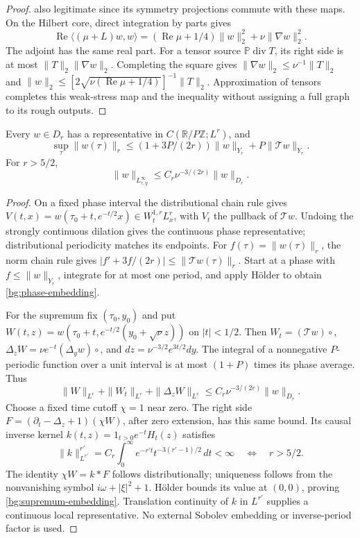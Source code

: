 \begin{proof}
also legitimate since its symmetry projections commute with these maps.
On the Hilbert core, direct integration by parts gives
\[
 \operatorname{Re}\langle(\mu+L)w,w\rangle
       =(\operatorname{Re}\mu+1/4)\|w\|_2^2
                                      +\nu\|\nabla w\|_2^2.
\]
The adjoint has the same real part. For a tensor source
\(\mathbb P\operatorname{div}T\), its right side is at most
\(\|T\|_2\|\nabla w\|_2\). Completing the square gives
\(\|\nabla w\|_2\le\nu^{-1}\|T\|_2\) and
\(\|w\|_2\le[2\sqrt{\nu(\operatorname{Re}\mu+1/4)}]^{-1}\|T\|_2\).
Approximation of tensors completes this weak-stress map and the
inequality without assigning a full graph to its rough outputs.
\end{proof}

\begin{lemma}\label{bg:graph-embeddings}
Every \(w\in D_r\) has a representative in
\(C(\mathbb R/P\mathbb Z;L^r)\), and
\begin{equation}\label{bg:phase-embedding}
 \sup_\tau\|w(\tau)\|_r
 \le(1+3P/(2r))\|w\|_{Y_r}+P\|\mathcal Tw\|_{Y_r}.
\end{equation}
For \(r>5/2\),
\begin{equation}\label{bg:supremum-embedding}
 \|w\|_{L^\infty_{\tau,y}}
       \le C_r\nu^{-3/(2r)}\|w\|_{D_r}.
\end{equation}
\end{lemma}

\begin{proof}
On a fixed phase interval the distributional chain rule gives
\(V(t,x)=w(\tau_0+t,e^{-t/2}x)\in W^{1,r}_tL^r_x\), with
\(V_t\) the pullback of \(\mathcal Tw\). Undoing the strongly
continuous dilation gives the continuous phase representative;
distributional periodicity matches its endpoints. For
\(f(\tau)=\|w(\tau)\|_r\), the norm chain rule gives
\(\lvert f'+3f/(2r)\rvert\le\|\mathcal Tw(\tau)\|_r\).
Start at a phase with \(f\le\|w\|_{Y_r}\), integrate for at most
one period, and apply H\"older to obtain \eqref{bg:phase-embedding}.

For the supremum fix \((\tau_0,y_0)\) and put
\(W(t,z)=w(\tau_0+t,e^{-t/2}(y_0+\sqrt\nu z))\) on
\(|t|<1/2\). Then \(W_t=(\mathcal Tw)\circ\),
\(\Delta_zW=\nu e^{-t}(\Delta_yw)\circ\), and
\(dz=\nu^{-3/2}e^{3t/2}dy\). The integral of a nonnegative
\(P\)-periodic function over a unit interval is at most
\((1+P)\) times its phase average. Thus
\[
 \|W\|_{L^r}+\|W_t\|_{L^r}+\|\Delta_zW\|_{L^r}
       \le C_r\nu^{-3/(2r)}\|w\|_{D_r}.
\]
Choose a fixed time cutoff \(\chi=1\) near zero. The right side
\(F=(\partial_t-\Delta_z+1)(\chi W)\), after zero extension,
has this same bound. Its causal inverse kernel
\(k(t,z)=1_{t>0}e^{-t}H_t(z)\) satisfies
\[
 \|k\|_{L^{r'}}^{r'}
   =C_r\int_0^\infty e^{-r't}t^{-3(r'-1)/2}\,dt<\infty
       \quad\Longleftrightarrow\quad r>5/2.
\]
The identity \(\chi W=k*F\) follows distributionally; uniqueness
follows from the nonvanishing symbol \(i\omega+|\xi|^2+1\).
H\"older bounds its value at \((0,0)\), proving
\eqref{bg:supremum-embedding}. Translation continuity of \(k\) in
\(L^{r'}\) supplies a continuous local representative. No external
Sobolev embedding or inverse-period factor is used.
\end{proof}

